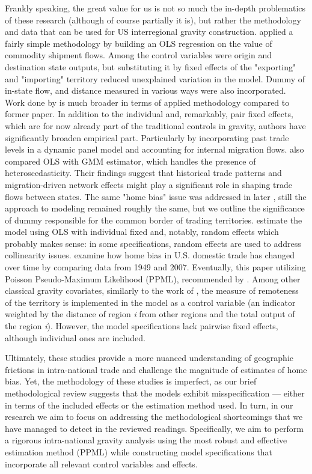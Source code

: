Frankly speaking, the great value for us is not so much the in-depth problematics of these research (although of course partially it is), but rather the methodology and data that can be used for US interregional gravity construction. \textcite{hillberry2003intranational} applied a fairly simple methodology by building an OLS regression on the value of commodity shipment flows. Among the control variables were origin and destination state outputs, but substituting it by fixed effects of the "exporting" and "importing" territory reduced unexplained variation in the model. Dummy of in-state flow, and distance measured in various ways were also incorporated. Work done by \textcite{millimet2007state} is much broader in terms of applied methodology compared to former paper. In addition to the individual and, remarkably, pair fixed effects, which are for now already part of the traditional controls in gravity, authors have significantly broaden empirical part. Particularly by incorporating past trade levels in a dynamic panel model and accounting for internal migration flows. \textcite{millimet2007state} also compared OLS with GMM estimator, which handles the presence of heteroscedasticity. Their findings suggest that historical trade patterns and migration-driven network effects might play a significant role in shaping trade flows between states. The same "home bias" issue was addressed in later \textcite{coughlin2013international}, still the approach to modeling remained roughly the same, but we outline the significance of dummy responsible for the common border of trading territories. \textcite{coughlin2013international} estimate the model using OLS with individual fixed and, notably, random effects which probably makes sense: in some specifications, random effects are used to address collinearity issues. \textcite{crafts2014geography} examine how home bias in U.S. domestic trade has changed over time by comparing data from 1949 and 2007. Eventually, this paper utilizing Poisson Pseudo-Maximum Likelihood (PPML), recommended by \textcite{silva2006log}. Among other classical gravity covariates, similarly to the work of \textcite{millimet2007state}, the measure of remoteness of the territory is implemented in the model as a control variable (an indicator weighted by the distance of region \textit{i} from other regions and the total output of the region \textit{i}). However, the model specifications lack pairwise fixed effects, although individual ones are included.

Ultimately, these studies provide a more nuanced understanding of geographic frictions in intra-national trade and challenge the magnitude of estimates of home bias. Yet, the methodology of these studies is imperfect, as our brief methodological review suggests that the models exhibit misspecification — either in terms of the included effects or the estimation method used. In turn, in our research we aim to focus on addressing the methodological shortcomings that we have managed to detect in the reviewed readings. Specifically, we aim to perform a rigorous intra-national gravity analysis using the most robust and effective estimation method (PPML) while constructing model specifications that incorporate all relevant control variables and effects.

